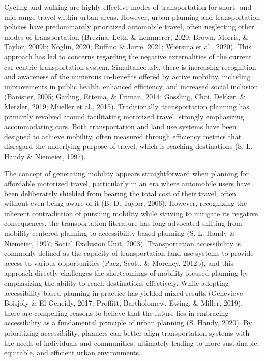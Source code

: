\documentclass[
11pt, %
oneside, %
english, %
singlespacing, %
]{macthesis} %
\begin{document}
Cycling and walking are highly effective modes of transportation for short- and mid-range travel within urban areas. However, urban planning and transportation policies have predominantly prioritized automobile travel, often neglecting other modes of transportation (Brezina, Leth, \& Lemmerer, 2020; Brown, Morris, \& Taylor, 2009b; Koglin, 2020; Ruffino \& Jarre, 2021; Wiersma et al., 2020). This approach has led to concerns regarding the negative externalities of the current car-centric transportation system. Simultaneously, there is increasing recognition and awareness of the numerous co-benefits offered by active mobility, including improvements in public health, enhanced efficiency, and increased social inclusion (Banister, 2005; Garling, Ettema, \& Friman, 2014; Gossling, Choi, Dekker, \& Metzler, 2019; Mueller et al., 2015). Traditionally, transportation planning has primarily revolved around facilitating motorized travel, strongly emphasizing accommodating cars. Both transportation and land use systems have been designed to achieve mobility, often measured through efficiency metrics that disregard the underlying purpose of travel, which is reaching destinations (S. L. Handy \& Niemeier, 1997).

The concept of generating mobility appears straightforward when planning for affordable motorized travel, particularly in an era where automobile users have been deliberately shielded from bearing the total cost of their travel, often without even being aware of it (B. D. Taylor, 2006). However, recognizing the inherent contradiction of pursuing mobility while striving to mitigate its negative consequences, the transportation literature has long advocated shifting from mobility-centered planning to accessibility-based planning (S. L. Handy \& Niemeier, 1997; Social Exclusion Unit, 2003). Transportation accessibility is commonly defined as the capacity of transportation-land use systems to provide access to various opportunities (Paez, Scott, \& Morency, 2012b), and this approach directly challenges the shortcomings of mobility-focused planning by emphasizing the ability to reach destinations effectively. While adopting accessibility-based planning in practice has yielded mixed results (Genevieve Boisjoly \& El-Geneidy, 2017; Proffitt, Bartholomew, Ewing, \& Miller, 2019), there are compelling reasons to believe that the future lies in embracing accessibility as a fundamental principle of urban planning (S. Handy, 2020). By prioritizing accessibility, planners can better align transportation systems with the needs of individuals and communities, ultimately leading to more sustainable, equitable, and efficient urban environments.
\end{document}
